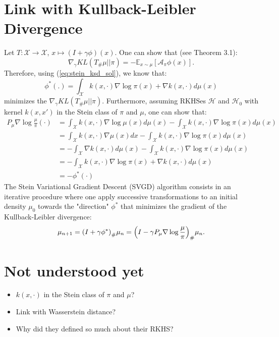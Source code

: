 \documentclass[runningheads,a4paper]{llncs}
\newcommand{\E}{\mathbb{E}}
\newcommand{\X}{\mathcal{X}}
\newcommand{\A}{\mathcal{A}}
\newcommand{\Hr}{\mathcal{H}}
\DeclarePairedDelimiter{\pare}{(}{)}
\begin{document}
\section{Link with Kullback-Leibler Divergence}
Let $T: \X \to \X$, $x \mapsto (I + \gamma \phi)(x)$. One can show that
(see \cite{https://doi.org/10.48550/arxiv.1608.04471} Theorem 3.1):
\begin{equation}
  \nabla_\gamma KL(T_\#\mu || \pi) = -\E_{x \sim \mu}[\A_\pi \phi(x)].
  \label{eq:grad_kl}
\end{equation}
Therefore, using (\ref{eq:stein_ksd_sol}), we know that:
\begin{equation}
  \phi^*(.) = \int_\X k(x, \cdot) \nabla \log \pi(x) + \nabla k(x, \cdot) d\mu(x)
\end{equation}
minimizes the $\nabla_\gamma KL(T_\#\mu || \pi)$.
Furthermore, assuming RKHSes $\Hr$ and $\Hr_0$ with kernel $k(x, x')$ in the Stein class of $\pi$ and $\mu$,
one can show that:
\begin{equation}
  \begin{split}
    P_\mu \nabla \log \frac{\mu}{\pi} (\cdot) &=
      \int_\X k(x, \cdot) \nabla \log \mu(x) d\mu(x) - \int_\X k(x, \cdot) \nabla \log \pi (x) d\mu(x) \\
    &= \int_\X k(x, \cdot) \nabla \mu(x) dx - \int_\X k(x, \cdot) \nabla \log \pi (x) d\mu(x) \\
    &= - \int_\X \nabla k(x, \cdot) d\mu(x) - \int_\X k(x, \cdot) \nabla \log \pi (x) d\mu(x) \\
    &= - \int_\X k(x, \cdot) \nabla \log \pi (x) + \nabla k(x, \cdot) d\mu(x) \\
    &= -\phi^*(\cdot)
  \end{split}
\end{equation}
The Stein Variational Gradient Descent (SVGD) algorithm consists
in an iterative procedure where one apply successive transformations
to an initial density $\mu_0$ towards
the "direction" $\phi^*$ that minimizes the gradient of the Kullback-Leibler divergence:
\begin{equation}
  \mu_{n+1} = \pare*{ I + \gamma \phi^* }_\# \mu_n = \pare*{ I - \gamma P_\mu \nabla \log \frac{\mu}{\pi} }_\# \mu_n.
\end{equation}

\section{Not understood yet}
\begin{itemize}
  \item $k(x, \cdot)$ in the Stein class of $\pi$ and $\mu$?
  \item Link with Wasserstein distance?
  \item Why did they defined so much about their RKHS?
\end{itemize}



\end{document}
